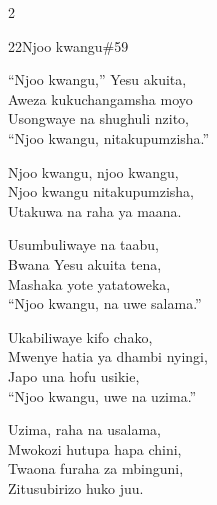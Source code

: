 \documentclass{article}
\begin{document}
\begin{multicols}{2}
\begin{hymn}{22}{Njoo kwangu}{\#59}
\begin{stanza}
``Njoo kwangu,'' Yesu akuita,\\
Aweza kukuchangamsha moyo\\
Usongwaye na shughuli nzito,\\
``Njoo kwangu, nitakupumzisha.''
\end{stanza}
\begin{chorus}
Njoo kwangu, njoo kwangu,\\
Njoo kwangu nitakupumzisha,\\
Utakuwa na raha ya maana.
\end{chorus}
\begin{stanza}
Usumbuliwaye na taabu,\\
Bwana Yesu akuita tena,\\
Mashaka yote yatatoweka,\\
``Njoo kwangu, na uwe salama.''
\end{stanza}
\begin{stanza}
Ukabiliwaye kifo chako,\\
Mwenye hatia ya dhambi nyingi,\\
Japo una hofu usikie,\\
``Njoo kwangu, uwe na uzima.''
\end{stanza}
\begin{stanza}
Uzima, raha na usalama,\\
Mwokozi hutupa hapa chini,\\
Twaona furaha za mbinguni,\\
Zitusubirizo huko juu.
\end{stanza}
\end{hymn}


\end{multicols}
\end{document}
